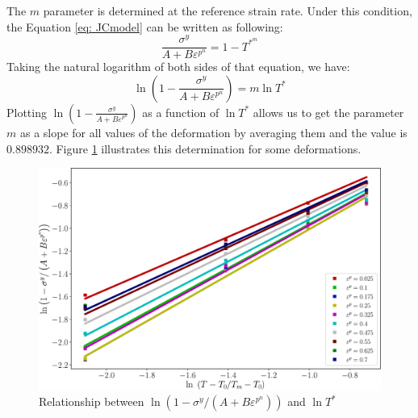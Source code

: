 \documentclass[twoside,english,1p,final,sort&compress]{elsarticle}
\theoremstyle{plain}
\begin{document}
The $m$ parameter is determined at the reference strain rate. Under this condition, the Equation \ref{eq: JCmodel} can be written as following:
\begin{equation}
\frac{\sigma^y}{A + B\varepsilon^{p^n}} = 1 - T^{*^m}
\end{equation}
Taking the natural logarithm of both sides of that equation, we have:
\begin{equation}
\ln\left(1 - \frac{\sigma^y}{A + B\varepsilon^{p^n}}\right)  = m\ln T^*
\end{equation}
Plotting $\ln\left(1 - \frac{\sigma^y}{A + B\varepsilon^{p^n}}\right)$ as a function of $\ln T^*$ allows us to get the parameter $m$ as a slope for all values of the deformation by averaging them and the value is $0.898932$. Figure \ref{fig:JCSigmaT} illustrates this determination for some deformations.
\begin{figure}[!ht]
\centering
\includegraphics[width=0.85\columnwidth]
{Figures/JCSigmaT}
\caption{Relationship between $\ln\left(1 - \sigma^y/\left(A + B\varepsilon^{p^n}\right)\right)$ and $\ln T^*$}
\label{fig:JCSigmaT}
\end{figure}
\end{document}
